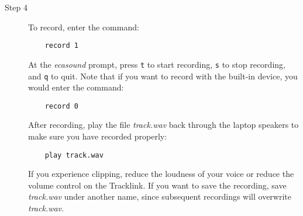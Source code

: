 \documentclass{article}
\begin{document}
\begin{description}
\item[Step 4]

To record, enter the command:

\begin{verbatim}
    record 1
\end{verbatim}

At the {\it ecasound} prompt, press \verb!t! to start recording, \verb!s! to
stop recording, and \verb!q! to quit.
Note that if you want to record with the built-in
device, you would enter the command:

\begin{verbatim}
    record 0
\end{verbatim}

After recording,
play the file {\it track.wav} back through the laptop speakers
to make sure you have recorded properly:

\begin{verbatim}
    play track.wav
\end{verbatim}

If you experience clipping, reduce the loudness of your voice or
reduce the volume control on the Tracklink.
If you want to save the recording, save {\it track.wav}
under another name, since subsequent recordings will
overwrite {\it track.wav}.

\end{description}
\end{document}
